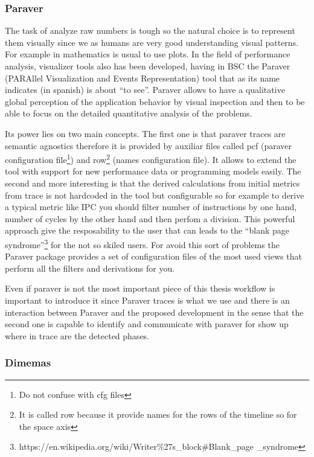 \subsubsection{Paraver}

The task of analyze raw numbers is tough so the natural choice is to represent 
them visually since we as humans are very
good understanding visual patterns. For example in mathematics
is usual to use plots. In the field of performance analysis, visualizer tools
also has been developed, having in BSC the Paraver (PARAllel Visualization and
Events Representation) tool that as its name indicates
(in spanish) is  about ``to see''. Paraver allows to have a qualitative global 
perception of the application behavior by visual inspection and then to be able 
to focus on the detailed quantitative analysis of the problems.

Its power lies on two main concepts. The first one is that paraver traces are
semantic agnostics therefore it is provided by auxiliar files called pcf (paraver
configuration file\footnote{Do not confuse with cfg files}) and row\footnote{It 
is called row because it provide names for the rows of the timeline so for the 
space axis} (names configuration file). It allows to extend the tool with
support for new performance data or programming models easily. The second and
more interesting is that the derived calculations from initial metrics from trace is
not hardcoded in the tool but configurable so for example to derive a typical
metric like IPC you should filter number of
instructions by one hand, number of cycles by the other hand and then perfom a
division. This powerful approach give the resposability to the user that can
leads to the ``blank page
syndrome''\footnote{https://en.wikipedia.org/wiki/Writer\%27s\_block\#Blank\_page
\_syndrome} for the not so skiled users. For avoid this
sort of problems the Paraver package provides a set of configuration files of
the most used views that perform all the filters and derivations for you.

Even if paraver is not the most important piece of this thesis workflow is
important to introduce it since Paraver traces is what we use and  there is an
interaction between Paraver and the proposed development in the sense that the
second one is capable to identify and communicate with paraver for show up where
in trace are the detected phases.

\subsubsection{Dimemas}

